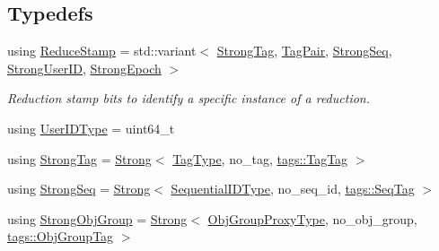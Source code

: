 \subsection*{Typedefs}
\begin{DoxyCompactItemize}
\item 
using \hyperlink{namespacevt_1_1collective_1_1reduce_1_1detail_abcd205dec83706f347d55c7528bf2664}{Reduce\+Stamp} = std\+::variant$<$ \hyperlink{namespacevt_1_1collective_1_1reduce_1_1detail_a5e1b708dc12ad0d1209a354ed21ed744}{Strong\+Tag}, \hyperlink{structvt_1_1collective_1_1reduce_1_1detail_1_1_tag_pair}{Tag\+Pair}, \hyperlink{namespacevt_1_1collective_1_1reduce_1_1detail_affec2854d7d65bafb17eb259714e9443}{Strong\+Seq}, \hyperlink{namespacevt_1_1collective_1_1reduce_1_1detail_af9e42b20d1be7dccc1b5e587f0387e02}{Strong\+User\+ID}, \hyperlink{namespacevt_1_1collective_1_1reduce_1_1detail_ad6739d14b8ee41189f785355708748fc}{Strong\+Epoch} $>$
\begin{DoxyCompactList}\small\item\em Reduction stamp bits to identify a specific instance of a reduction. \end{DoxyCompactList}\item 
using \hyperlink{namespacevt_1_1collective_1_1reduce_1_1detail_ae82d7b96b0885b9b7dfb0104398beead}{User\+I\+D\+Type} = uint64\+\_\+t
\item 
using \hyperlink{namespacevt_1_1collective_1_1reduce_1_1detail_a5e1b708dc12ad0d1209a354ed21ed744}{Strong\+Tag} = \hyperlink{namespacevt_adbd3338278905742eb2de6db590fd2f1}{Strong}$<$ \hyperlink{namespacevt_a84ab281dae04a52a4b243d6bf62d0e52}{Tag\+Type}, no\+\_\+tag, \hyperlink{structvt_1_1collective_1_1reduce_1_1detail_1_1tags_1_1_tag_tag}{tags\+::\+Tag\+Tag} $>$
\item 
using \hyperlink{namespacevt_1_1collective_1_1reduce_1_1detail_affec2854d7d65bafb17eb259714e9443}{Strong\+Seq} = \hyperlink{namespacevt_adbd3338278905742eb2de6db590fd2f1}{Strong}$<$ \hyperlink{namespacevt_a3063d4db3b879d6dd2c7b8d50995c7f6}{Sequential\+I\+D\+Type}, no\+\_\+seq\+\_\+id, \hyperlink{structvt_1_1collective_1_1reduce_1_1detail_1_1tags_1_1_seq_tag}{tags\+::\+Seq\+Tag} $>$
\item 
using \hyperlink{namespacevt_1_1collective_1_1reduce_1_1detail_afd4940b3a4ac2ef740f0e3844a09dd08}{Strong\+Obj\+Group} = \hyperlink{namespacevt_adbd3338278905742eb2de6db590fd2f1}{Strong}$<$ \hyperlink{namespacevt_ad7cae989df485fccca57f0792a880a8e}{Obj\+Group\+Proxy\+Type}, no\+\_\+obj\+\_\+group, \hyperlink{structvt_1_1collective_1_1reduce_1_1detail_1_1tags_1_1_obj_group_tag}{tags\+::\+Obj\+Group\+Tag} $>$

\end{DoxyCompactItemize}
